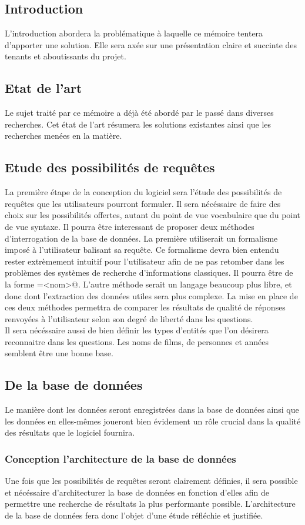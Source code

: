 \documentclass[a4paper,12pt]{article}
\begin{document}
\subsection{Introduction}
L'introduction abordera la problématique à laquelle ce mémoire tentera d'apporter une solution.
Elle sera axée sur une présentation claire et succinte des tenants et aboutissants du projet.
\subsection{Etat de l'art}
Le sujet traité par ce mémoire a déjà été abordé par le passé dans diverses recherches.
Cet état de l'art résumera les solutions existantes ainsi que les recherches menées en la matière.
\subsection{Etude des possibilités de requêtes}
La première étape de la conception du logiciel sera l'étude des possibilités de requêtes que les utilisateurs pourront formuler.
Il sera nécéssaire de faire des choix sur les possibilités offertes, autant du point de vue vocabulaire que du point de vue syntaxe.
Il pourra être interessant de proposer deux méthodes d'interrogation de la base de données.
La première utiliserait un formalisme imposé à l'utilisateur balisant sa requête.
Ce formalisme devra bien entendu rester extrèmement intuitif pour l'utilisateur afin de ne pas retomber dans les problèmes des systèmes de recherche d'informations classiques.
Il pourra être de la forme \verb@actor=<nom>@. 
L'autre méthode serait un langage beaucoup plus libre, et donc dont l'extraction des données utiles sera plus complexe. 
La mise en place de ces deux méthodes permettra de comparer les résultats de qualité de réponses renvoyées à l'utilisateur selon son degré de liberté dans les questions. \\

Il sera nécéssaire aussi de bien définir les types d'entités que l'on désirera reconnaitre dans les questions.
Les noms de films, de personnes et années semblent être une bonne base. 
\subsection{De la base de données}
Le manière dont les données seront enregistrées dans la base de données ainsi que les données en elles-mêmes joueront bien évidement un rôle crucial dans la qualité des résultats que le logiciel fournira.
\subsubsection{Conception l'architecture de la base de données}
Une fois que les possibilités de requêtes seront clairement définies, il sera possible et nécéssaire d'architecturer la base de données en fonction d'elles afin de permettre une recherche de résultats la plus performante possible.
L'architecture de la base de données fera donc l'objet d'une étude réfléchie et justifiée.
\end{document}

